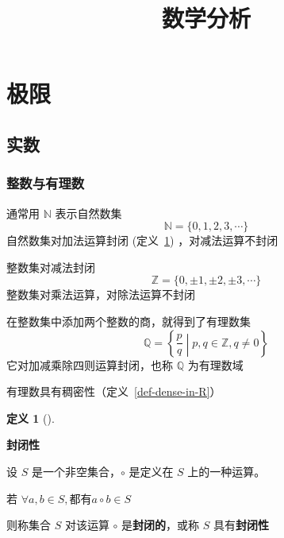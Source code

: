 \documentclass[
  chinese-hans,
]{ctexart}
\title{数学分析}
\author{}
\date{}
\theoremstyle{definition}
\newtheorem{definition}{定义}[section]
\theoremstyle{remark}
\begin{document}
\maketitle


\section{极限}\label{ux6781ux9650}

\subsection{实数}\label{ux5b9eux6570}

\subsubsection{整数与有理数}\label{ux6574ux6570ux4e0eux6709ux7406ux6570}

通常用 \(\mathbb{N}\) 表示自然数集 \[
\mathbb{N} = \{0,1,2,3,\cdots\}
\] 自然数集对加法运算封闭 (定义~\ref{def-closure}) ，对减法运算不封闭

整数集对减法封闭 \[
\mathbb{Z} = \{0,\pm1,\pm2,\pm3,\cdots\}
\] 整数集对乘法运算，对除法运算不封闭

在整数集中添加两个整数的商，就得到了有理数集 \[
\mathbb{Q} =\left\{\frac{p}{q}\middle|p,q \in \mathbb{Z},q \neq 0\right\}
\] 它对加减乘除四则运算封闭，也称 \(\mathbb{Q}\) 为有理数域

有理数具有稠密性（定义~\ref{def-dense-in-R}）

\begin{definition}[]\protect\hypertarget{def-closure}{}\label{def-closure}

\textbf{封闭性}

设 \(S\) 是一个非空集合，\(\circ\) 是定义在 \(S\) 上的一种运算。

若 \(\forall a,b \in S ,都有 a \circ b \in S\)

则称集合 \(S\) 对该运算 \(\circ\) 是\textbf{封闭的}，或称 \(S\)
具有\textbf{封闭性}

\end{definition}
\end{document}
